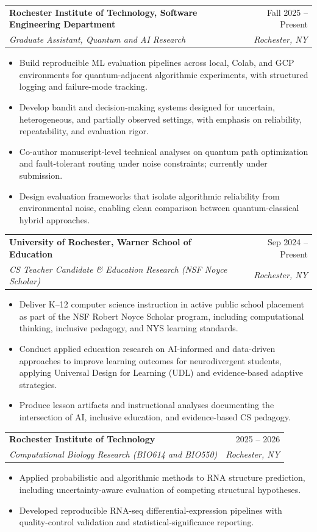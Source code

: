 \documentclass[11pt]{article}
\makeatletter
\newcommand{\entry}[4]{
  \noindent\begin{tabularx}{\textwidth}{@{}Xr@{}}
    \textbf{#1} & #2 \\
    \textit{#3} & \textit{#4}
  \end{tabularx}\vspace{2pt}
}
\makeatother
\begin{document}
\entry{Rochester Institute of Technology, Software Engineering Department}{Fall 2025 -- Present}{Graduate Assistant, Quantum and AI Research}{Rochester, NY}
\begin{itemize}
  \item Build reproducible ML evaluation pipelines across local, Colab, and GCP environments for quantum-adjacent algorithmic experiments, with structured logging and failure-mode tracking.
  \item Develop bandit and decision-making systems designed for uncertain, heterogeneous, and partially observed settings, with emphasis on reliability, repeatability, and evaluation rigor.
  \item Co-author manuscript-level technical analyses on quantum path optimization and fault-tolerant routing under noise constraints; currently under submission.
  \item Design evaluation frameworks that isolate algorithmic reliability from environmental noise, enabling clean comparison between quantum-classical hybrid approaches.
\end{itemize}

\entry{University of Rochester, Warner School of Education}{Sep 2024 -- Present}{CS Teacher Candidate \& Education Research (NSF Noyce Scholar)}{Rochester, NY}
\begin{itemize}
  \item Deliver K--12 computer science instruction in active public school placement as part of the NSF Robert Noyce Scholar program, including computational thinking, inclusive pedagogy, and NYS learning standards.
  \item Conduct applied education research on AI-informed and data-driven approaches to improve learning outcomes for neurodivergent students, applying Universal Design for Learning (UDL) and evidence-based adaptive strategies.
  \item Produce lesson artifacts and instructional analyses documenting the intersection of AI, inclusive education, and evidence-based CS pedagogy.
\end{itemize}

\entry{Rochester Institute of Technology}{2025 -- 2026}{Computational Biology Research (BIO614 and BIO550)}{Rochester, NY}
\begin{itemize}
  \item Applied probabilistic and algorithmic methods to RNA structure prediction, including uncertainty-aware evaluation of competing structural hypotheses.
  \item Developed reproducible RNA-seq differential-expression pipelines with quality-control validation and statistical-significance reporting.
\end{itemize}
\end{document}
